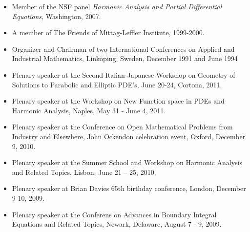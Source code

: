 \documentclass{article}
\begin{document}
\begin{itemize}  
\item  Member of the NSF panel {\it Harmonic Analysis and Partial Differential Equations}, Washington, 2007.
\item A member of The Friends of
Mittag-Leffler Institute, 1999-2000.
 \item Organizer and Chairman of two
International Conferences on 
  Applied and Industrial Mathematics,
Link\"oping, Sweden, December 1991 
  and June 1994

\item Plenary speaker at the Second Italian-Japanese Workshop on Geometry of Solutions to Parabolic and Elliptic PDE's, June 20-24, Cortona, 2011.
 \item Plenary speaker at the Workshop on New Function space in PDEs and Harmonic Analysis, Naples, May 31 - June 4, 2011.
 \item Plenary speaker at the Conference on Open Mathematical Problems from Industry and Elsewhere,  John Ockendon celebration event, Oxford,  December 9,  2010.
  \item  Plenary speaker at the Summer School and Workshop on Harmonic Analysis and Related Topics, Lisbon, June 21 -- 25, 2010.
 \item  Plenary speaker at Brian Davies 65th birthday conference, London, December 9-10, 2009.
 \item  Plenary speaker at the Conferens on Advances in Boundary Integral Equations and Related Topics, Newark, Delaware, August 7 - 9, 2009.


\end{itemize}
\end{document}
